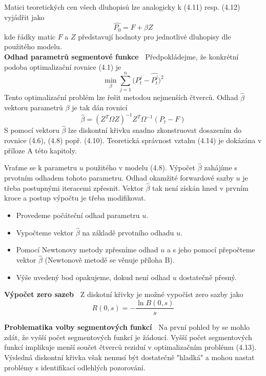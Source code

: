 \documentclass[a4paper]{book}
\begin{document}
Matici teoretických cen všech dluhopisů lze analogicky k (4.11) resp. (4.12) vyjádřit jako
\begin{equation*}
\hat{P_0} = F + \beta Z
\end{equation*}
kde řádky matic $F$ a $Z$ představují hodnoty pro jednotlivé dluhopisy dle použitého modelu.\\

\noindent \textbf{Odhad parametrů segmentové funkce~} Předpokládejme, že konkrétní podoba optimalizační rovnice (4.1) je
\begin{equation}
\underset{\beta}{\min}\sum_{j=1}^n \Big( P_t^j - \hat{P_t^j} \Big)^2
\end{equation}
Tento optimalizační problém lze řešit metodou nejmenších čtverců. Odhad $\hat{\beta}$ vektoru parametrů $\beta$ je tak dán rovnicí
\begin{equation}
\hat{\beta} = (Z^T \Omega Z)^{-1}Z^T \Omega^{-1}(P_t - F)
\end{equation}
S pomocí vektoru $\hat{\beta}$ lze diskontní křivku snadno zkonstruovat dosazením do rovnice (4.6), (4.8) popř. (4.10). Teoretická správnost vztahu (4.14) je dokázána v příloze A této kapitoly.

Vraťme se k parametru $u$ použitého v modelu (4.8). Výpočet $\hat{\beta}$ zahájíme s prvotním odhadem tohoto parametru. Odhad okamžité forwardové sazby $u$ je třeba postupnými iteracemi zpřesnit. Vektor $\hat{\beta}$ tak není získán hned v prvním kroce a postup výpočtu je třeba modifikovat.
\begin{itemize}
\item Provedeme počáteční odhad parametru $u$.
\item Vypočteme vektor $\hat{\beta}$ na základě prvotního odhadu $u$.
\item Pomocí Newtonovy metody zpřesníme odhad $u$ a s jeho pomocí přepočteme vektor $\hat{\beta}$ (Newtonově metodě se věnuje příloha B).
\item Výše uvedený bod opakujeme, dokud není odhad $u$ dostatečně přesný.
\end{itemize}

\noindent \textbf{Výpočet zero sazeb~} Z diskotní křivky je možné vypočíst zero sazby jako
\begin{equation*}
R(0,s) = - \frac{\ln B(0,s)}{s}
\end{equation*}

\noindent \textbf{Problematika volby segmentových funkcí~} Na první pohled by se mohlo zdát, že vyšší počet segmentových funkcí je žádoucí. Vyšší počet segmentových funkcí implikuje menší součet čtverců reziduí v optimalizačním problému (4.13). Výsledná diskontní křivka však nemusí být dostatečně "hladká" a mohou nastat problémy s identifikací odlehlých pozorování.
\end{document}
